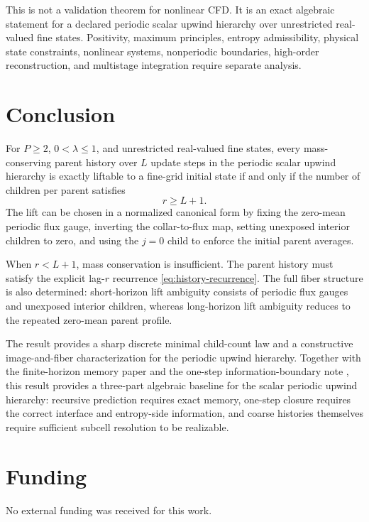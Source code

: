 \documentclass[11pt]{article}
\begin{document}
This is not a validation theorem for nonlinear CFD.  It is an exact algebraic
statement for a declared periodic scalar upwind hierarchy over unrestricted
real-valued fine states.  Positivity, maximum principles, entropy
admissibility, physical state constraints, nonlinear systems, nonperiodic
boundaries, high-order reconstruction, and multistage integration require
separate analysis.

\section{Conclusion}
\label{sec:conclusion}

For \(P\ge2\), \(0<\lambda\le1\), and unrestricted real-valued fine states,
every mass-conserving parent history over \(L\) update steps in the periodic
scalar upwind hierarchy is exactly liftable to a fine-grid initial state if
and only if the number of children per parent satisfies
\[
  r\ge L+1.
\]
The lift can be chosen in a normalized canonical form by fixing the
zero-mean periodic flux gauge, inverting the collar-to-flux map, setting
unexposed interior children to zero, and using the \(j=0\) child to enforce the initial parent averages.

When \(r<L+1\), mass conservation is insufficient.  The parent history must
satisfy the explicit lag-\(r\) recurrence \eqref{eq:history-recurrence}.
The full fiber structure is also determined: short-horizon lift ambiguity
consists of periodic flux gauges and unexposed interior children, whereas
long-horizon lift ambiguity reduces to the repeated zero-mean parent profile.

The result provides a sharp discrete minimal child-count law and a
constructive image-and-fiber characterization for the periodic upwind
hierarchy. Together with the finite-horizon memory paper
\cite{polemitis2026exactfinitehorizonmemoryconditioning} and the one-step
information-boundary note \cite{PolemitisChristakisDrikakis2026OneStep},
this result provides a three-part algebraic baseline for the scalar periodic
upwind hierarchy: recursive prediction requires exact memory, one-step
closure requires the correct interface and entropy-side information, and
coarse histories themselves require sufficient subcell resolution to be
realizable.

\section*{Funding}

No external funding was received for this work.
\end{document}
